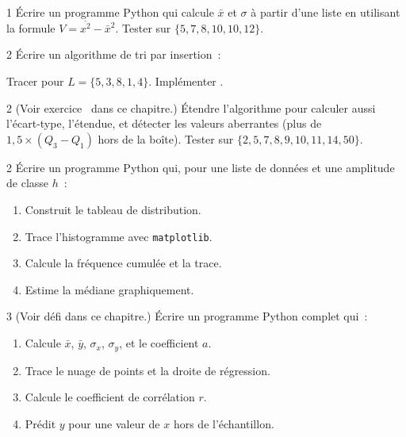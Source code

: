 \begin{exo}{1}
\'Ecrire un programme Python qui calcule $\bar{x}$ et $\sigma$
\`a partir d'une liste en utilisant la formule $V=\overline{x^2}-\bar{x}^2$.
Tester sur $\{5,7,8,10,10,12\}$.
\end{exo}

\begin{exo}{2}
\'Ecrire un algorithme de tri par insertion~:

\begin{algorithm}[H]
\caption{Tri par insertion}
\end{algorithm}

Tracer pour $L=\{5,3,8,1,4\}$. Impl\'ementer \computer.
\end{exo}

\begin{exo}{2}
(Voir exercice \logicoalgo\ dans ce chapitre.)
\'Etendre l'algorithme pour calculer aussi l'\'ecart-type, l'\'etendue,
et d\'etecter les valeurs aberrantes (plus de $1{,}5\times(Q_3-Q_1)$
hors de la bo\^ite).
Tester sur $\{2,5,7,8,9,10,11,14,50\}$.
\end{exo}

\begin{exo}{2}
\'Ecrire un programme Python qui, pour une liste de donn\'ees et
une amplitude de classe $h$~:
\begin{enumerate}
  \item Construit le tableau de distribution.
  \item Trace l'histogramme avec \texttt{matplotlib}.
  \item Calcule la fr\'equence cumul\'ee et la trace.
  \item Estime la m\'ediane graphiquement.
\end{enumerate}
\end{exo}

\begin{exo}{3}
(Voir d\'efi dans ce chapitre.)
\'Ecrire un programme Python complet qui~:
\begin{enumerate}
  \item Calcule $\bar{x}$, $\bar{y}$, $\sigma_x$, $\sigma_y$, et le coefficient $a$.
  \item Trace le nuage de points et la droite de r\'egression.
  \item Calcule le coefficient de corr\'elation $r$.
  \item Pr\'edit $y$ pour une valeur de $x$ hors de l'\'echantillon.
\end{enumerate}
\end{exo}

